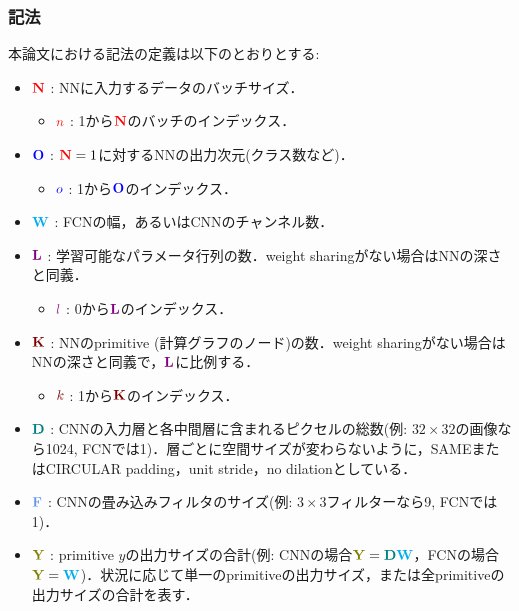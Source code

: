 \subsubsection{記法}
本論文における記法の定義は以下のとおりとする:
\begin{itemize}
    \item $\textcolor{red}{\bm{\mathrm{N}}}$ : NNに入力するデータのバッチサイズ．
    \begin{itemize}
        \item $\textcolor{red}{n}$ : 1から$\textcolor{red}{\bm{\mathrm{N}}}$のバッチのインデックス．
    \end{itemize}
    \item $\textcolor{blue}{\bm{\mathrm{O}}}$ : $\textcolor{red}{\bm{\mathrm{N}}}=1$に対するNNの出力次元(クラス数など)．
    \begin{itemize}
        \item $\textcolor{blue}{o}$ : 1から$\textcolor{blue}{\bm{\mathrm{O}}}$のインデックス．
    \end{itemize}
    \item $\textcolor{cyan}{\bm{\mathrm{W}}}$ : FCNの幅，あるいはCNNのチャンネル数．
    \item $\textcolor{violet}{\bm{\mathrm{L}}}$ : 学習可能なパラメータ行列の数．weight sharingがない場合はNNの深さと同義．
    \begin{itemize}
        \item $\textcolor{violet}{l}$ : 0から$\textcolor{violet}{\bm{\mathrm{L}}}$のインデックス．
    \end{itemize}
    \item $\maroon{\bmrm{K}}$ : NNのprimitive (計算グラフのノード)の数．weight sharingがない場合はNNの深さと同義で，$\textcolor{violet}{\bm{\mathrm{L}}}$に比例する．
    \begin{itemize}
        \item $\maroon{k}$ : 1から$\maroon{\bmrm{K}}$のインデックス．
    \end{itemize}
    \item $\textcolor{teal}{\bm{\mathrm{D}}}$ : CNNの入力層と各中間層に含まれるピクセルの総数(例: $32 \times 32$の画像なら1024, FCNでは1)．層ごとに空間サイズが変わらないように，SAMEまたはCIRCULAR padding，unit stride，no dilationとしている．
    \item $\cfblue{\bmrm{F}}$ : CNNの畳み込みフィルタのサイズ(例: $3 \times 3$フィルターなら9, FCNでは1)．
    \item $\olive{\bmrm{Y}}$ : primitive $y$の出力サイズの合計(例: CNNの場合$\olive{\bmrm{Y}}=\teal{\bmrm{D}}\cyan{\bmrm{W}}$，FCNの場合$\olive{\bmrm{Y}}=\cyan{\bmrm{W}}$)．状況に応じて単一のprimitiveの出力サイズ，または全primitiveの出力サイズの合計を表す．
    \begin{itemize}

\end{itemize}
\end{itemize}
